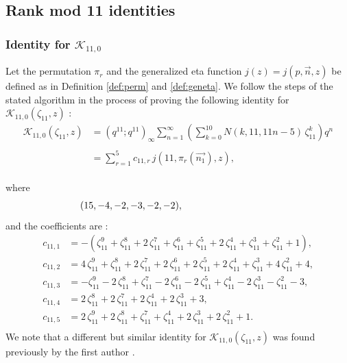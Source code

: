 \documentclass[12pt]{amsart}
\theoremstyle{definition}
\theoremstyle{remark}
\numberwithin{equation}{section}
\newcommand\Lpar[1]{\left(#1\right)}
\newcommand\refdef[1]{\ref{def:#1}}
\begin{document}


\subsection{Rank mod 11 identities}
\label{subsec:mod11}

\subsubsection{\textbf{Identity for $\mathcal{K}_{11,0}$}}

Let the permutation $\pi_r$ and the generalized eta function $j(z)=j(p,\overrightarrow{n},z)$ be defined as in Definition \refdef{perm} and \refdef{geneta}. We follow the steps of the stated algorithm in the process of proving the following identity for $\mathcal{K}_{11,0}(\zeta_{11},z)$ :
\\
\begin{align}
\mathcal{K}_{11,0}(\zeta_{11},z)&=(q^{11};q^{11})_\infty \sum_{n=1}^\infty \Lpar{\sum_{k=0}^{10} N(k,11,11n-5)\,\zeta_{11}^k}q^n \label{eq:rank11id0} \\
\nonumber
\\
&=\sum_{r=1}^{5} c_{11,r}\,j(11,\pi_r(\overrightarrow{n_1}),z),
\nonumber
\end{align}
\\
where 
\begin{align*}
\hspace{-43mm}\overrightarrow{n_1}=(15,-4,-2,-3,-2,-2),
\end{align*}
and the coefficients are :\\
\begin{align*}
c_{11,1} &=-(\zeta_{11}^{9}+\zeta_{11}^{8}+2\,\zeta_{11}^{7}+\zeta_{11}^{6}+\zeta_{11}^{5}+2 \,\zeta_{11}^{4}+\zeta_{11}^{3}+\zeta_{11}^{2}+1),
\\
c_{11,2} &=4\,\zeta_{11}^{9}+\zeta_{11}^{8}+2\,\zeta_{11}^{7}+2\,\zeta_{11}^{6}+2\,\zeta_{11}^{5}+2 \,\zeta_{11}^{4}+\zeta_{11}^{3}+4\,\zeta_{11}^{2}+4,
\\
c_{11,3} &=-\zeta_{11}^{9}-2\,\zeta_{11}^{8}+\zeta_{11}^{7}-2\,\zeta_{11}^{6}-2\,\zeta_{11}^{5}+\zeta_{11}^{4}-2\,\zeta_{11}^{3}-\zeta_{11}^{2}-3,
\\
c_{11,4} &=2\,\zeta_{11}^{8}+2\,\zeta_{11}^{7}+2\,\zeta_{11}^{4}+2\,\zeta_{11}^{3}+3,
\\
c_{11,5} &=2\,\zeta_{11}^{9}+2\,\zeta_{11}^{8}+\zeta_{11}^{7}+\zeta_{11}^{4}+2\,\zeta_{11}^{3}+2 \,\zeta_{11}^{2}+1.\\
\end{align*}
We note that a different but similar identity for 
$\mathcal{K}_{11,0}(\zeta_{11},z)$ was found previously by the first
author \cite[Section 6.4]{Ga19a}. 
\end{document}
